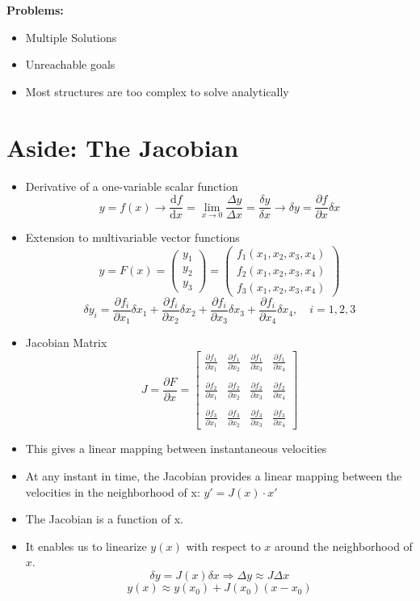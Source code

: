 \documentclass{article}
\newcommand{\der}{\text{d}}
\begin{document}
\textbf{Problems:}
\begin{itemize}
    \item Multiple Solutions
    \item Unreachable goals
    \item Most structures are too complex to solve analytically
\end{itemize}

\section*{Aside: The Jacobian}
\begin{itemize}
    \item Derivative of a one-variable scalar function
    \[y = f(x) \rightarrow \frac{\der f}{\der x} = \lim_{x \rightarrow 0} \frac{\Delta y}{\Delta x} = \frac{\delta y}{\delta x} \rightarrow \delta y = \frac{\partial f}{\partial x} \delta x\]
    \item Extension to multivariable vector functions
    \[y = F(x) = \begin{pmatrix}y_1 \\ y_2 \\ y_3 \end{pmatrix} = \begin{pmatrix}f_1(x_1, x_2, x_3, x_4) \\ f_2 (x_1, x_2, x_3, x_4) \\ f_3 (x_1, x_2, x_3, x_4)\end{pmatrix}\]
    \[\delta y_i = \frac{\partial f_i}{\partial x_1} \delta x_1 + \frac{\partial f_i}{\partial x_2} \delta x_2 + \frac{\partial f_i}{\partial x_3} \delta x_3 + \frac{\partial f_i}{\partial x_4} \delta x_4, \quad i = 1, 2, 3\]
    \item Jacobian Matrix
    \[J = \frac{\partial F}{\partial x} = \begin{bmatrix} 
        \frac{\partial f_1}{\partial x_1} & \frac{\partial f_1}{\partial x_2} & \frac{\partial f_1}{\partial x_3} & \frac{\partial f_1}{\partial x_4} \\
        \\
        \frac{\partial f_2}{\partial x_1} & \frac{\partial f_2}{\partial x_2} & \frac{\partial f_2}{\partial x_3} & \frac{\partial f_2}{\partial x_4} \\
        \\
        \frac{\partial f_3}{\partial x_1} & \frac{\partial f_3}{\partial x_2} & \frac{\partial f_3}{\partial x_3} & \frac{\partial f_3}{\partial x_4}
    \end{bmatrix}\]
    \item This gives a linear mapping between instantaneous velocities
    \item At any instant in time, the Jacobian provides a linear mapping between the velocities in the neighborhood of x: $y' = J(x) \cdot x'$
    \item The Jacobian is a function of x.
    \item It enables us to linearize $y(x)$ with respect to $x$ around the neighborhood of $x$.
    \[\delta y = J(x) \delta x \Rightarrow \Delta y \approx J\Delta x\]
    \[y(x) \approx y(x_0) + J(x_0)(x - x_0)\]
\end{itemize}
\end{document}
